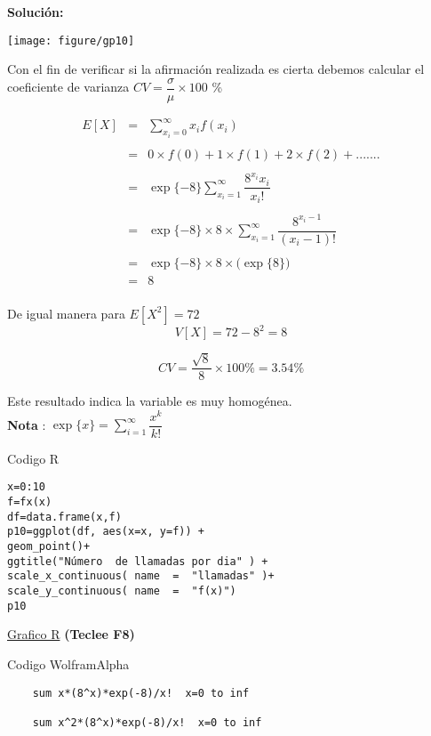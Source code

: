 \documentclass[base=hide,12pt]{elegantbook}
\begin{document}
\textcolor{col3}{\bf Solución: }\\


\begin{center}
	\texttt{[image: figure/gp10]}
\end{center}
Con el fin de verificar si la afirmación realizada es cierta debemos calcular el coeficiente de varianza $CV = \dfrac{\sigma}{\mu} \times 100$ \%



\begin{eqnarray*}
	E[X] & = & \sum_{x_i=0}^{\infty} x_{i} f(x_{i}) \\
	 &&\\
	     & = & 0 \times f(0) + 1 \times f(1) + 2 \times f(2) + ....... \\  
	      &&\\
	     & = & \exp\{-8\} \sum_{x_i=1}^{\infty} \dfrac{8^{x_{i}}x_{i} }{x_{i}!} \\
	     &&\\
	    & = & \exp\{-8\}\times 8 \times \sum_{x_i=1}^{\infty} \dfrac{8^{x_{i}-1}}{(x_{i}-1)!} \\
	    &&\\
	    &=& \exp\{-8\} \times 8 \times \Big(\exp\{8\}\Big) \\
	    & = & 8 \\
\end{eqnarray*}

De igual manera para $E[X^{2}] =72$\\


$$V[X] = 72 - 8^{2} = 8 $$

$$ CV= \dfrac{\sqrt{8}}{8} \times 100 \% = 3.54 \%$$

Este resultado indica la variable es muy homogénea.\\ 

\textcolor{col5}{\bf Nota }: $\exp\{x\} =  \displaystyle\sum_{i=1}^{\infty} \dfrac{x^{k}}{k!}$

{\small
	\begin{Box3}{Codigo R}
		\begin{verbatim}
x=0:10
f=fx(x)
df=data.frame(x,f)
p10=ggplot(df, aes(x=x, y=f)) +
geom_point()+
ggtitle("Número  de llamadas por dia" ) +
scale_x_continuous( name  =  "llamadas" )+
scale_y_continuous( name  =  "f(x)") 
p10	
		\end{verbatim}
	\end{Box3}	
}

\begin{center}
	\href{https://rextester.com/ZDJHL42735}{Grafico R} \textcolor{col3}{\bf (Teclee F8)}
\end{center}

\begin{Box3}{Codigo WolframAlpha}
{\small	
\begin{verbatim}
	sum x*(8^x)*exp(-8)/x!  x=0 to inf
	
	sum x^2*(8^x)*exp(-8)/x!  x=0 to inf
	
\end{verbatim}
}	
\end{Box3}
\end{document}
